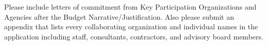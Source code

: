 Please include letters of commitment from Key Participation Organizations and Agencies after the Budget Narrative/Justification. Also please submit an appendix that lists
every collaborating organization and individual names in the application including
staff, consultants, contractors, and advisory board members. 